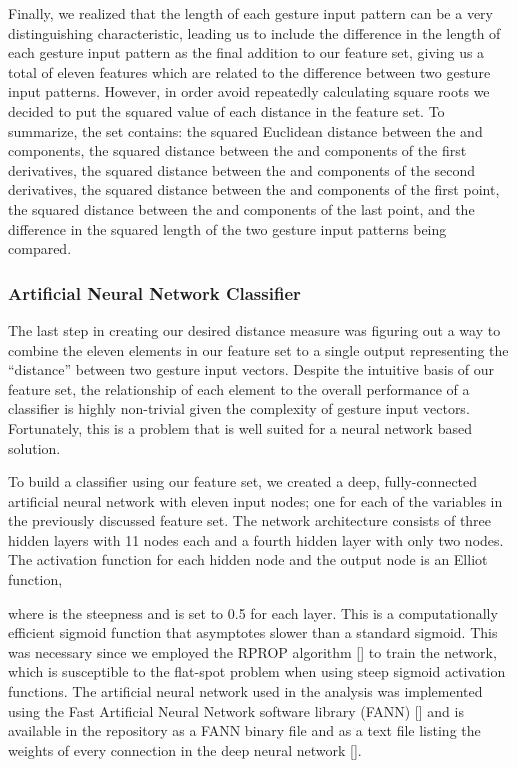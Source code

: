 \documentclass[final,1p,times,authoryear]{elsarticle}
\begin{document}
Finally, we realized that the length of each gesture input pattern can be
a very distinguishing characteristic, leading us to include the difference
in the length of each gesture input pattern as the final addition to our feature
set, giving us a total of eleven features which are related to the
difference between two gesture input patterns. However, in order avoid repeatedly
calculating square roots we decided to put the squared value of each
distance in the feature set. To summarize, the set contains: the squared
Euclidean distance between the  and  components, the squared distance
between the  and  components of the first derivatives, the squared 
distance between the  and  components of the second derivatives,
the squared distance between the  and  components of the first
point, the squared distance between the  and  components of
the last point, and the difference in the squared length of the two
gesture input patterns being compared.

\subsubsection{Artificial Neural Network Classifier}
The last step in creating our desired distance measure was figuring
out a way to combine the eleven elements in our feature set to a single
output representing the ``distance'' between two gesture input vectors.
Despite the intuitive basis of our feature set, the relationship of
each element to the overall performance of a classifier is highly
non-trivial given the complexity of gesture input vectors. Fortunately,
this is a problem that is well suited for a neural network based solution.

To build a classifier using our feature set, we created a deep, fully-connected
artificial neural network with eleven input nodes; one for each of
the variables in the previously discussed feature set. The network
architecture consists of three hidden layers with 11 nodes each and
a fourth hidden layer with only two nodes. The activation function
for each hidden node and the output node is an Elliot function,


where  is the steepness and is set to 0.5 for each layer. This
is a computationally efficient sigmoid function that asymptotes
slower than a standard sigmoid. This was necessary since we employed
the RPROP algorithm [\cite{rprop}] to train the network, which is
susceptible to the flat-spot problem when using steep sigmoid activation
functions. The artificial neural network used in the analysis was
implemented using the Fast Artificial Neural Network software library
(FANN) [\cite{nissen03}] and is available in the repository as a FANN binary
file and as a text file listing the weights of every connection in the deep neural network [\cite{dodona}].
\end{document}
